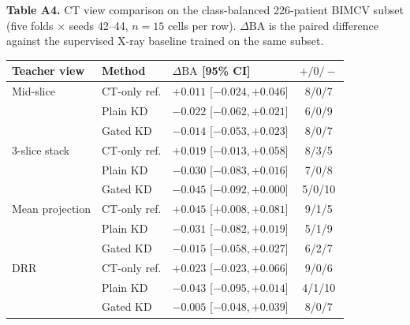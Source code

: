 \documentclass[pdflatex,sn-vancouver,Numbered]{sn-jnl}
\begin{document}
\begin{minipage}{\textwidth}
{\small\noindent\textbf{Table A4.} CT view comparison on the class-balanced 226-patient BIMCV subset (five folds $\times$ seeds 42--44, $n{=}15$ cells per row). $\Delta\mathrm{BA}$ is the paired difference against the supervised X-ray baseline trained on the same subset.\par}
\vspace{6pt}


\centering
\scriptsize
\setlength{\tabcolsep}{2.5pt}
\renewcommand{\arraystretch}{0.88}
\begin{tabularx}{\columnwidth}{@{}p{}lXc@{}}
\toprule
Teacher view & Method & $\Delta\mathrm{BA}$ [95\% CI] & $+/0/-$ \\
\midrule
Mid-slice            & CT-only ref.  & $+0.011$ [$-0.024,+0.046$] & 8/0/7 \\
                     & Plain KD      & $-0.022$ [$-0.062,+0.021$] & 6/0/9 \\
                     & Gated KD      & $-0.014$ [$-0.053,+0.023$] & 8/0/7 \\
3-slice stack        & CT-only ref.  & $+0.019$ [$-0.013,+0.058$] & 8/3/5 \\
                     & Plain KD      & $-0.030$ [$-0.083,+0.016$] & 7/0/8 \\
                     & Gated KD      & $-0.045$ [$-0.092,+0.000$] & 5/0/10 \\
Mean projection      & CT-only ref.  & $+0.045$ [$+0.008,+0.081$] & 9/1/5 \\
                     & Plain KD      & $-0.031$ [$-0.082,+0.019$] & 5/1/9 \\
                     & Gated KD      & $-0.015$ [$-0.058,+0.027$] & 6/2/7 \\
DRR                  & CT-only ref.  & $+0.023$ [$-0.023,+0.066$] & 9/0/6 \\
                     & Plain KD      & $-0.043$ [$-0.095,+0.014$] & 4/1/10 \\
                     & Gated KD      & $-0.005$ [$-0.048,+0.039$] & 8/0/7 \\
\bottomrule
\end{tabularx}
\end{minipage}
\clearpage
\end{document}
